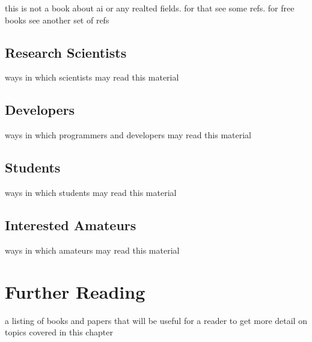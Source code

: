 this is not a book about ai or any realted fields. for that see some refs. 
for free books see another set of refs

\subsection{Research Scientists}
ways in which scientists may read this material

\subsection{Developers}
ways in which programmers and developers may read this material

\subsection{Students}
ways in which students may read this material

\subsection{Interested Amateurs}
ways in which amateurs may read this material


% 
% 
\section{Further Reading}
\label{intro:sec:further_reading}

a listing of books and papers that will be useful for a reader to get more detail on topics covered in this chapter

